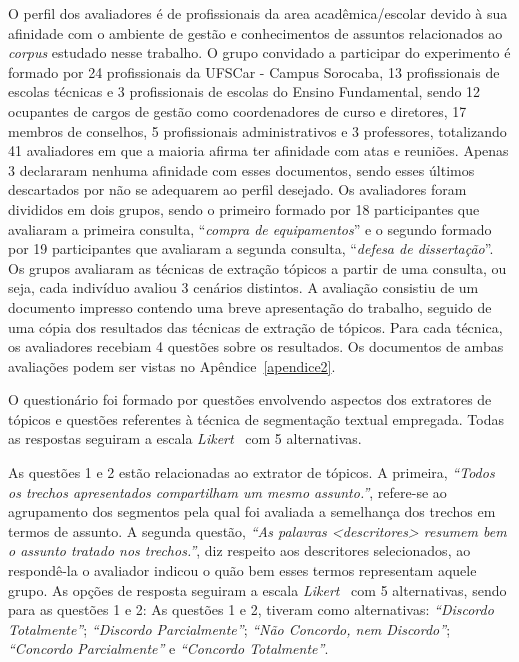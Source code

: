 O perfil dos avaliadores é de profissionais da area acadêmica/escolar devido à sua afinidade com o ambiente de gestão e conhecimentos de assuntos relacionados ao \textit{corpus} estudado nesse trabalho. O grupo convidado a participar do experimento é formado por 24 profissionais da UFSCar - Campus Sorocaba, 13 profissionais de escolas técnicas e 3 profissionais de escolas do Ensino Fundamental, sendo 12 ocupantes de cargos de gestão como coordenadores de curso e diretores, 17 membros de conselhos, 5 profissionais administrativos e 3 professores, totalizando 41 avaliadores em que a maioria afirma ter afinidade com atas e reuniões. Apenas 3 declararam nenhuma afinidade com esses documentos, sendo esses últimos descartados por não se adequarem ao perfil desejado. Os avaliadores foram divididos em dois grupos, sendo o primeiro formado por 18 participantes que avaliaram a primeira consulta, ``\textit{compra de equipamentos}'' e o segundo formado por 19 participantes que avaliaram a segunda consulta, ``\textit{defesa de dissertação}''. Os grupos avaliaram as técnicas de extração tópicos a partir de uma consulta, ou seja, cada indivíduo avaliou 3 cenários distintos. A avaliação consistiu de um documento impresso contendo uma breve apresentação do trabalho, seguido de uma cópia dos resultados das técnicas de extração de tópicos. Para cada técnica, os avaliadores recebiam 4 questões sobre os resultados. Os documentos de ambas avaliações podem ser vistas no Apêndice~\ref{apendice2}.


O questionário foi formado por questões envolvendo aspectos dos extratores de tópicos e questões referentes à técnica de segmentação textual empregada.
Todas as respostas seguiram a escala \textit{Likert}~\cite{Norman2010} com 5 alternativas. 
%

As questões 1 e 2 estão relacionadas ao extrator de tópicos. 
A primeira, \textit{``Todos os trechos apresentados compartilham um mesmo assunto.''}, refere-se ao agrupamento dos segmentos pela qual foi avaliada a semelhança dos trechos em termos de assunto. 
A segunda questão, \textit{``As palavras \textit{<descritores>} resumem bem o assunto tratado nos trechos.''}, diz respeito aos descritores selecionados, ao respondê-la o avaliador indicou o quão bem esses termos representam aquele grupo.
As opções de resposta seguiram a escala \textit{Likert}~\cite{Norman2010} com 5 alternativas, sendo para as questões 1 e 2:
As questões 1 e 2, tiveram como alternativas: 
% 
		\textit{``Discordo Totalmente''}; 
		\textit{``Discordo Parcialmente''}; 
		\textit{``Não Concordo, nem Discordo''}; 
		\textit{``Concordo Parcialmente''} e 
		\textit{``Concordo Totalmente''}.  
%
%
%

